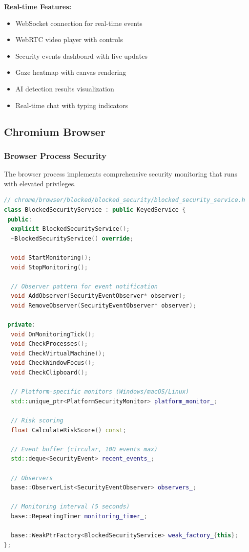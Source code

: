 \documentclass[11pt,letterpaper]{article}
\begin{document}
\textbf{Real-time Features:}
\begin{itemize}[noitemsep]
    \item WebSocket connection for real-time events
    \item WebRTC video player with controls
    \item Security events dashboard with live updates
    \item Gaze heatmap with canvas rendering
    \item AI detection results visualization
    \item Real-time chat with typing indicators
\end{itemize}

\subsection{Chromium Browser}

\subsubsection{Browser Process Security}

The browser process implements comprehensive security monitoring that runs with elevated privileges.

\begin{lstlisting}[language=C++, caption=Security Monitoring Service]
// chrome/browser/blocked/blocked_security/blocked_security_service.h
class BlockedSecurityService : public KeyedService {
 public:
  explicit BlockedSecurityService();
  ~BlockedSecurityService() override;

  void StartMonitoring();
  void StopMonitoring();

  // Observer pattern for event notification
  void AddObserver(SecurityEventObserver* observer);
  void RemoveObserver(SecurityEventObserver* observer);

 private:
  void OnMonitoringTick();
  void CheckProcesses();
  void CheckVirtualMachine();
  void CheckWindowFocus();
  void CheckClipboard();

  // Platform-specific monitors (Windows/macOS/Linux)
  std::unique_ptr<PlatformSecurityMonitor> platform_monitor_;

  // Risk scoring
  float CalculateRiskScore() const;

  // Event buffer (circular, 100 events max)
  std::deque<SecurityEvent> recent_events_;

  // Observers
  base::ObserverList<SecurityEventObserver> observers_;

  // Monitoring interval (5 seconds)
  base::RepeatingTimer monitoring_timer_;

  base::WeakPtrFactory<BlockedSecurityService> weak_factory_{this};
};
\end{lstlisting}
\end{document}
